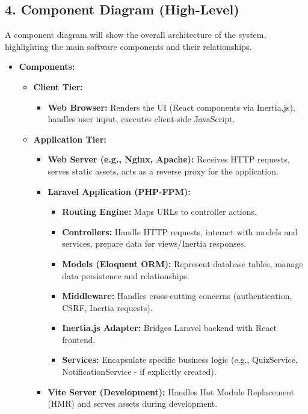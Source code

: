 \subsection*{4. Component Diagram (High-Level)}

A component diagram will show the overall architecture of the system, highlighting the main software components and their relationships.

\begin{itemize}
    \item \textbf{Components:}
    \begin{itemize}
        \item \textbf{Client Tier:}
        \begin{itemize}
            \item \textbf{Web Browser:} Renders the UI (React components via Inertia.js), handles user input, executes client-side JavaScript.
        \end{itemize}
        \item \textbf{Application Tier:}
        \begin{itemize}
            \item \textbf{Web Server (e.g., Nginx, Apache):} Receives HTTP requests, serves static assets, acts as a reverse proxy for the application.
            \item \textbf{Laravel Application (PHP-FPM):}
            \begin{itemize}
                \item \textbf{Routing Engine:} Maps URLs to controller actions.
                \item \textbf{Controllers:} Handle HTTP requests, interact with models and services, prepare data for views/Inertia responses.
                \item \textbf{Models (Eloquent ORM):} Represent database tables, manage data persistence and relationships.
                \item \textbf{Middleware:} Handles cross-cutting concerns (authentication, CSRF, Inertia requests).
                \item \textbf{Inertia.js Adapter:} Bridges Laravel backend with React frontend.
                \item \textbf{Services:} Encapsulate specific business logic (e.g., QuizService, NotificationService - if explicitly created).
            \end{itemize}
            \item \textbf{Vite Server (Development):} Handles Hot Module Replacement (HMR) and serves assets during development.

\end{itemize}
\end{itemize}
\end{itemize}
